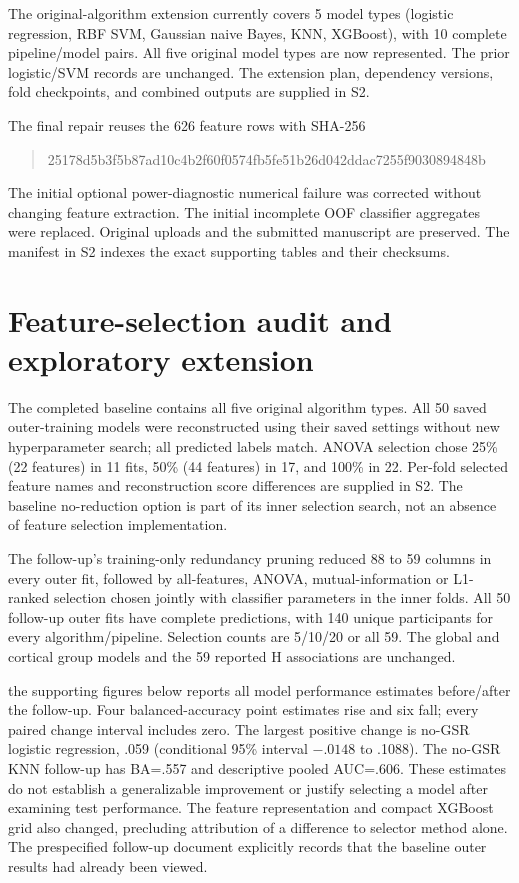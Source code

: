 \documentclass[10pt,letterpaper]{article}
\begin{document}
The original-algorithm extension currently covers 5 model types
(logistic regression, RBF SVM, Gaussian naive Bayes, KNN, XGBoost), with 10 complete pipeline/model pairs.
All five original model types are now represented.
The prior logistic/SVM records are unchanged. The extension plan, dependency versions,
fold checkpoints, and combined outputs are supplied in S2.

The final repair reuses the 626 feature rows with SHA-256
\begin{quote}\small\ttfamily
25178d5b3f5b87ad10c4b2f60f0574fb5fe51b26d042ddac7255f9030894848b
\end{quote}
The initial optional power-diagnostic numerical failure was corrected without
changing feature extraction. The initial incomplete OOF classifier aggregates
were replaced. Original uploads and the submitted manuscript are preserved.
The manifest in S2 indexes the exact supporting tables and their checksums.

\clearpage
\section*{Feature-selection audit and exploratory extension}
The completed baseline contains all five original algorithm types. All 50 saved
outer-training models were reconstructed using their saved settings without new
hyperparameter search; all predicted labels match. ANOVA selection chose 25\%
(22 features) in 11 fits, 50\% (44 features) in 17, and 100\% in 22. Per-fold
selected feature names and reconstruction score differences are supplied in S2.
The baseline no-reduction option is part of its inner selection search, not an
absence of feature selection implementation.

The follow-up's training-only redundancy pruning reduced 88 to 59 columns in
every outer fit, followed by all-features, ANOVA, mutual-information or L1-ranked
selection chosen jointly with classifier parameters in the inner folds. All
50 follow-up outer fits have complete predictions, with 140 unique participants
for every algorithm/pipeline. Selection counts are 5/10/20 or all 59. The global
and cortical group models and the 59 reported H associations are unchanged.

the supporting figures below reports all model performance estimates before/after
the follow-up. Four balanced-accuracy point estimates rise and six fall; every
paired change interval includes zero. The largest positive change is no-GSR
logistic regression, .059 (conditional 95\% interval $-.0148$ to .1088).
The no-GSR KNN follow-up has BA=.557 and descriptive pooled AUC=.606.
These estimates do not establish a generalizable improvement or justify selecting
a model after examining test performance. The feature representation and compact
XGBoost grid also changed, precluding attribution of a difference to selector
method alone. The prespecified follow-up document explicitly records that the
baseline outer results had already been viewed.
\end{document}
